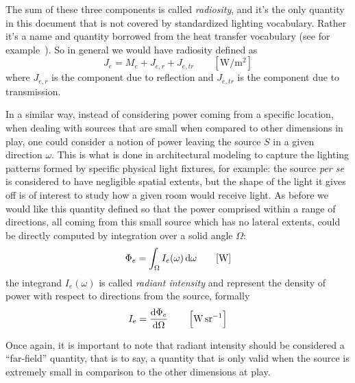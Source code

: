 The sum of these three components is called \textsl{\gls{radiosity}}, and it's the only quantity
in this document that is not covered by standardized lighting vocabulary. 
Rather it's a name and quantity borrowed from the heat transfer vocabulary 
(see for example~\cite{iso:9288:2022}).
So in general we would have radiosity defined as
\begin{displaymath}
	J_e = M_e + J_{e,r} + J_{e,tr} \qquad \left[\unit{\watt\per\square\meter}\right]
\end{displaymath}
where $J_{e,r}$ is the component due to reflection and $J_{e,tr}$ is the component due to transmission.

In a similar way, instead of considering power coming from a specific location,
when dealing with sources that are small when compared to other dimensions in play, 
one could consider a notion of power leaving the source $S$ in a given direction $\omega$.
This is what is done in architectural modeling to capture the lighting patterns formed by
specific physical light fixtures, for example: the source \emph{per se} is considered to have
negligible spatial extents, but the shape of the light it gives off is of interest to 
study how a given room would receive light.
As before we would like this quantity defined so that the power comprised within a range of
directions, all coming from this small source which has no lateral extents,
could be directly computed by integration over a solid angle $\Omega$:
\begin{displaymath}
	\Phi_e = \int_\Omega I_e(\omega) \d\omega \qquad [\unit{\watt}]
\end{displaymath}
the integrand $I_e(\omega)$ is called \textsl{\gls{radiant intensity}} and represent
the density of power with respect to directions from the source, formally
\begin{displaymath}
	I_e = \frac{\d\Phi_e}{\d\Omega} \qquad \left[\unit{\watt\per\steradian}\right]
\end{displaymath}

Once again, it is important to note that radiant intensity should be considered a
``far-field'' quantity, that is to say, a quantity that is only valid when
the source is extremely small in comparison to the other dimensions at play.

